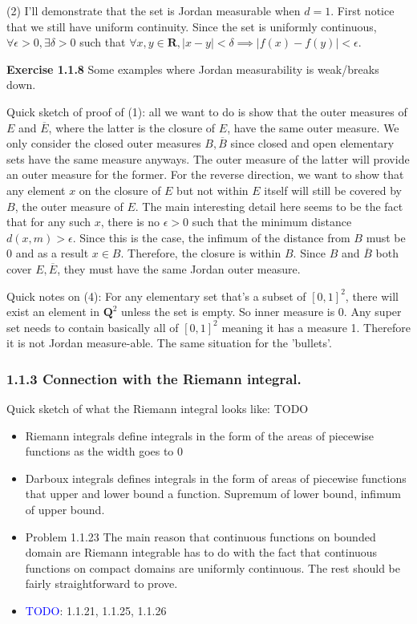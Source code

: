 \documentclass[answers,12pt]{exam}
\begin{document}
\begin{solution}
(2) I'll demonstrate that the set is Jordan measurable when $d=1$.
First notice that we still have uniform continuity.
Since the set is uniformly continuous, $\forall \epsilon > 0, \exists \delta > 0$ such that $\forall x,y \in \mathbf{R}, |x-y| < \delta \implies |f(x)-f(y)| < \epsilon$.
\end{solution}

\textbf{Exercise 1.1.8} Some examples where Jordan measurability is weak/breaks down.
\begin{solution}
    Quick sketch of proof of (1): all we want to do is show that the outer measures of $E$ and $\overline{E}$, where the latter is the closure of $E$, have the same outer measure.
    We only consider the closed outer measures $B, \overline{B}$ since closed and open elementary sets have the same measure anyways.
    The outer measure of the latter will provide an outer measure for the former.
    For the reverse direction, we want to show that any element $x$ on the closure of $E$ but not within $E$ itself will still be covered by $B$, the outer measure of $E$.
    The main interesting detail here seems to be the fact that for any such $x$, there is no $\epsilon >0$ such that the minimum distance $d(x, m)>\epsilon$.
    Since this is the case, the infimum of the distance from $B$ must be 0 and as a result $x \in B$.
    Therefore, the closure is within $B$.
    Since $B$ and $\overline{B}$ both cover $E, \overline{E}$, they must have the same Jordan outer measure.

    Quick notes on (4): For any elementary set that's a subset of $[0,1]^2$, there will exist an element in $\mathbf{Q}^2$ unless the set is empty. 
    So inner measure is 0.
    Any super set needs to contain basically all of $[0,1]^2$ meaning it has a measure 1.
    Therefore it is not Jordan measure-able.
    The same situation for the 'bullets'.
\end{solution}

\subsubsection{1.1.3 Connection with the Riemann integral.}
Quick sketch of what the Riemann integral looks like: TODO
\begin{itemize}
    \item Riemann integrals define integrals in the form of the areas of piecewise functions as the width goes to 0
    \item Darboux integrals defines integrals in the form of areas of piecewise functions that upper and lower bound a function.
    Supremum of lower bound, infimum of upper bound.
    \item Problem 1.1.23 The main reason that continuous functions on bounded domain are Riemann integrable has to do with the fact that continuous functions on compact domains are uniformly continuous.
    The rest should be fairly straightforward to prove.
    \item \textcolor{blue}{TODO}: 1.1.21, 1.1.25, 1.1.26  
\end{itemize}
\end{document}
